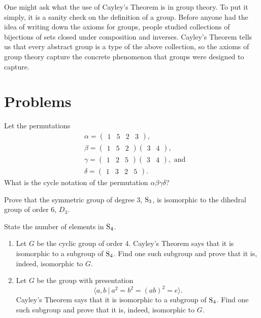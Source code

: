 One might ask what the use of Cayley's Theorem is in group theory. To put it simply, it is a sanity check on the definition of a group. Before anyone had the idea of writing down the axioms for groups, people studied collections of bijections of sets closed under composition and inverses. Cayley's Theorem tells us that every abstract group is a type of the above collection, so the axioms of group theory capture the concrete phenomenon that groups were designed to capture.

\newpage

\section{Problems}
\begin{problem}
    Let the permutations
    \begin{align*}
        &\alpha = \begin{pmatrix}1 & 5 & 2 & 3\end{pmatrix},\\
        &\beta  = \begin{pmatrix}1 & 5 & 2\end{pmatrix}\begin{pmatrix}3 & 4\end{pmatrix},\\
        &\gamma = \begin{pmatrix}1 & 2 & 5\end{pmatrix}\begin{pmatrix}3 & 4\end{pmatrix}, \text{ and}\\
        &\delta = \begin{pmatrix}1 & 3 & 2 & 5\end{pmatrix}.
    \end{align*}
    What is the cycle notation of the permutation $\alpha\beta\gamma\delta$?
\end{problem}

\begin{problem}
    Prove that the symmetric group of degree 3, $\mathrm{S}_{3}$, is isomorphic to the dihedral group of order 6, $D_3$.
\end{problem}

\begin{problem}
    State the number of elements in $\mathrm{S}_{4}$.
    \begin{enumerate}[label=(\alph*)]
        \item Let $G$ be the cyclic group of order 4. Cayley’s Theorem says that it is isomorphic to a subgroup of $\mathrm{S}_{4}$. Find one such subgroup and prove that it is, indeed, isomorphic to $G$.
        \item Let $G$ be the group with presentation
        \[
            \langle a, b \ | \ a^2 = b^2 = (ab)^2 = e \rangle.
        \]
        Cayley’s Theorem says that it is isomorphic to a subgroup of $\mathrm{S}_{4}$. Find one such subgroup and prove that it is, indeed, isomorphic to $G$.
    \end{enumerate}
\end{problem}

